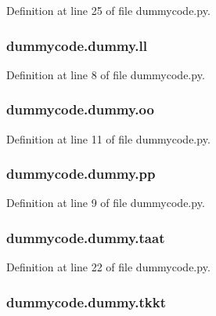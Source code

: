 Definition at line 25 of file dummycode.\-py.

\subsubsection[{ll}]{\setlength{\rightskip}{0pt plus 5cm}dummycode.\-dummy.\-ll}\label{classdummycode_1_1dummy_aff4159330a4c573597b401b5503818d7}


Definition at line 8 of file dummycode.\-py.

\subsubsection[{oo}]{\setlength{\rightskip}{0pt plus 5cm}dummycode.\-dummy.\-oo}\label{classdummycode_1_1dummy_a49635a45286e102fb960d0bc4f4c3621}


Definition at line 11 of file dummycode.\-py.

\subsubsection[{pp}]{\setlength{\rightskip}{0pt plus 5cm}dummycode.\-dummy.\-pp}\label{classdummycode_1_1dummy_a4ded8e4fa38d817b96c7b21a869a16ae}


Definition at line 9 of file dummycode.\-py.

\subsubsection[{taat}]{\setlength{\rightskip}{0pt plus 5cm}dummycode.\-dummy.\-taat}\label{classdummycode_1_1dummy_a638ed861d153ec60095bed0527eb89fc}


Definition at line 22 of file dummycode.\-py.

\subsubsection[{tkkt}]{\setlength{\rightskip}{0pt plus 5cm}dummycode.\-dummy.\-tkkt}\label{classdummycode_1_1dummy_ac97503870ca57fa0d663fcc8177e9f75}


